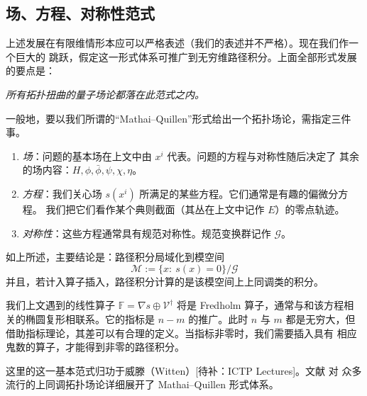 \subsection{场、方程、对称性范式}

上述发展在有限维情形本应可以严格表述（我们的表述并不严格）。现在我们作一个巨大的
跳跃，假定这一形式体系可推广到无穷维路径积分。上面全部形式发展的要点是：

\noindent\emph{所有拓扑扭曲的量子场论都落在此范式之内。}

一般地，要以我们所谓的“Mathai--Quillen”形式给出一个拓扑场论，需指定三件事。

\begin{enumerate}
\item \emph{场}：问题的基本场在上文中由 $x^i$ 代表。问题的方程与对称性随后决定了
  其余的场内容：$H,\phi,\bar\phi,\psi,\chi,\eta$。
\item \emph{方程}：我们关心场 $s(x^i)$ 所满足的某些方程。它们通常是有趣的偏微分方程。
  我们把它们看作某个典则截面（其丛在上文中记作 $E$）的零点轨迹。
\item \emph{对称性}：这些方程通常具有规范对称性。规范变换群记作 $\mathcal G$。
\end{enumerate}

如上所述，主要结论是：路径积分局域化到模空间
\begin{equation}
\mathcal M := \{x:\ s(x)=0\}/\mathcal G
\tag{3.59}
\end{equation}
并且，若计入算子插入，路径积分计算的是该模空间上上同调类的积分。

我们上文遇到的线性算子 $\mathbb F=\nabla s\oplus\mathcal V^{\dagger}$ 将是 Fredholm
算子，通常与和该方程相关的椭圆复形相联系。它的指标是 $n-m$ 的推广。此时 $n$ 与 $m$
都是无穷大，但借助指标理论，其差可以有合理的定义。当指标非零时，我们需要插入具有
相应鬼数的算子，才能得到非零的路径积分。

这里的这一基本范式归功于威滕（Witten）[待补：ICTP Lectures]。文献 \cite{ref4} 对
众多流行的上同调拓扑场论详细展开了 Mathai--Quillen 形式体系。

